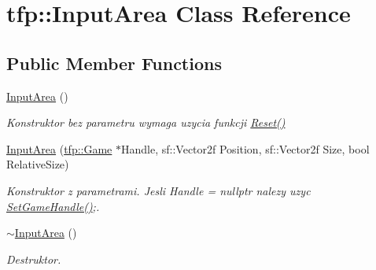 \hypertarget{classtfp_1_1_input_area}{}\section{tfp\+:\+:Input\+Area Class Reference}
\label{classtfp_1_1_input_area}
\subsection*{Public Member Functions}
\begin{DoxyCompactItemize}
\item 
\mbox{\label{classtfp_1_1_input_area_a4626f006411eb43975f151dbfeedbad9}} 
\mbox{\hyperlink{classtfp_1_1_input_area_a4626f006411eb43975f151dbfeedbad9}{Input\+Area}} ()
\begin{DoxyCompactList}\small\item\em Konstruktor bez parametru wymaga uzycia funkcji \mbox{\hyperlink{classtfp_1_1_input_area_a908d0161d3449c13f11fc5a5a2cfdb54}{Reset()}} \end{DoxyCompactList}\item 
\mbox{\label{classtfp_1_1_input_area_a36b1fa7432a3972e82d21e7afebe50ed}} 
\mbox{\hyperlink{classtfp_1_1_input_area_a36b1fa7432a3972e82d21e7afebe50ed}{Input\+Area}} (\mbox{\hyperlink{classtfp_1_1_game}{tfp\+::\+Game}} $\ast$Handle, sf\+::\+Vector2f Position, sf\+::\+Vector2f Size, bool Relative\+Size)
\begin{DoxyCompactList}\small\item\em Konstruktor z parametrami. Jesli Handle = nullptr nalezy uzyc \mbox{\hyperlink{classtfp_1_1_input_area_a432ae211e90f00df47213e1137a8bffd}{Set\+Game\+Handle()}};. \end{DoxyCompactList}\item 
\mbox{\label{classtfp_1_1_input_area_ab1654721345a6f0644cf6cc6ffa1111b}} 
\mbox{\hyperlink{classtfp_1_1_input_area_ab1654721345a6f0644cf6cc6ffa1111b}{$\sim$\+Input\+Area}} ()
\begin{DoxyCompactList}\small\item\em Destruktor. \end{DoxyCompactList}\item 
\mbox{\label{classtfp_1_1_input_area_a908d0161d3449c13f11fc5a5a2cfdb54}} 

\end{DoxyCompactItemize}
